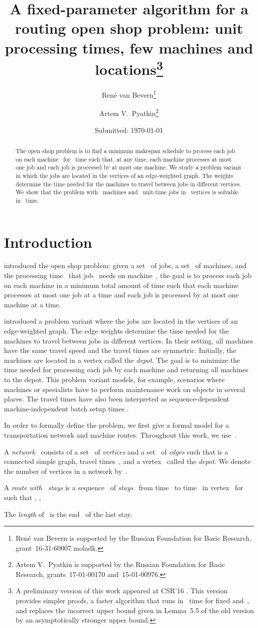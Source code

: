 \documentclass[natbib,sort,smallextended,envcountsame,envcountsect,numbook]{svjour3}
\title{A fixed-parameter algorithm for a routing open shop problem: unit processing times, few machines and locations\thanks{A preliminary version of this work appeared at CSR'16 \citep{BP16}.  This version provides simpler proofs, a faster algorithm that runs in ~time for fixed  and~, and replaces the incorrect upper bound given in Lemma~5.5 of the old version by an asymptotically stronger upper bound.}}
\author{René van Bevern\thanks{René van Bevern is supported
by the Russian Foundation for Basic Research, grant~16-31-60007 mol\textunderscore{}a\textunderscore{}dk.}
\and
Artem V.\ Pyatkin\thanks{Artem V.\ Pyatkin is supported
by the Russian Foundation for Basic Research, grants~17-01-00170 and~15-01-00976.}}
\institute{René van Bevern \and Artem V.\ Pyatkin \at Novosibirsk
  State University, Novosibirsk, Russian Federation,
  \email{rvb@nsu.ru, artem@math.nsc.ru} \and René van Bevern \and
  Artem V.\ Pyatkin \at Sobolev Institute of Mathematics of the
  Siberian Branch of the Russian Academy of Sciences, Novosibirsk,
  Russian Federation}
\date{Submitted: \today{}}
\begin{document}
\maketitle
\begin{abstract}
  \noindent{}
  The open shop problem is
  to find a minimum makespan schedule
  to process each job~
  on each machine~
  for ~time
  such that,
  at any time,
  each machine processes at most one job
  and
  each job is processed by at most one machine.
  We study a problem variant in which the jobs are located
  in the vertices
  of an edge-weighted graph.
  The weights determine the time needed
  for the machines
  to travel between jobs in different vertices.
  We show that the problem with ~machines and
  ~unit-time jobs in ~vertices
  is solvable in ~time.
\end{abstract}
\section{Introduction} 
\noindent
\citet{GS76} introduced the open shop problem:
given
a set~ of jobs,
a set~ of machines,
and the processing time~ that job~ needs on machine~,
the goal is
to process each job on each machine
in a minimum total amount of time
such that
each machine processes at most one job at a time
and
each job is processed by at most one machine at a time.

\citet{ABC06} introduced a problem variant
where the jobs are located
in the vertices of an edge-weighted graph.
The edge weights determine
the time needed for the machines to travel between jobs in different vertices.
In their setting, all machines have the same travel speed
and
the travel times are symmetric.
Initially,
the machines are located in a vertex called the \emph{depot}.
The goal is to minimize
the time needed for processing
each job by each machine and
returning all machines to the depot.
This problem variant models, for example, scenarios
where machines or specialists
have to perform maintenance work
on objects in several places.
The travel times have also been interpreted
as sequence-dependent machine-independent
batch setup times \citep{ANCK08,ZW06}.

In order to formally define the problem,
we first give a formal model for a transportation network
and machine routes.
Throughout this work,
we use~.

\begin{definition}
  A \emph{network}~ consists of
  a set~ of \emph{vertices} and
  a set~ of \emph{edges}
  such that  is a connected simple graph,
  travel times~,
  and a vertex~ called the \emph{depot}.
  We denote the number of vertices in a network
  by~. 
  
  A \emph{route with ~stays} is
  a sequence~
  of \emph{stays}~
  from time~ to time~
  in vertex~ for 
  such that , ,
  
  The \emph{length} of~ is the end~ of the last stay.  
\end{definition}
\end{document}
